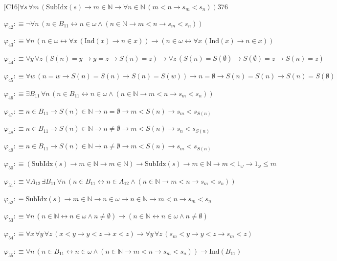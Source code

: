 \begin{fullproof}{[C16]}{$\forall s\,\forall m\,(\mathrm{SubIdx}(s) \to m \in \mathbb{N} \to \forall n \in \mathbb{N}\,(m < n \to s_{m} < s_{n}))$}{376}
\begin{abbrevlist}
\item $\varphi_{42} :\equiv \neg \forall n\,(n \in B_{11} \leftrightarrow n \in \omega \land (n \in \mathbb{N} \to m < n \to s_{m} < s_{n}))$
\item $\varphi_{43} :\equiv \forall n\,(n \in \omega \leftrightarrow \forall x\,(\mathrm{Ind}(x) \to n \in x)) \to (n \in \omega \leftrightarrow \forall x\,(\mathrm{Ind}(x) \to n \in x))$
\item $\varphi_{44} :\equiv \forall y\,\forall z\,(S(n) = y \to y = z \to S(n) = z) \to \forall z\,(S(n) = S(\emptyset) \to S(\emptyset) = z \to S(n) = z)$
\item $\varphi_{45} :\equiv \forall w\,(n = w \to S(n) = S(n) \to S(n) = S(w)) \to n = \emptyset \to S(n) = S(n) \to S(n) = S(\emptyset)$
\item $\varphi_{46} :\equiv \exists B_{11}\,\forall n\,(n \in B_{11} \leftrightarrow n \in \omega \land (n \in \mathbb{N} \to m < n \to s_{m} < s_{n}))$
\item $\varphi_{47} :\equiv n \in B_{11} \to S(n) \in \mathbb{N} \to n = \emptyset \to m < S(n) \to s_{m} < s_{S(n)}$
\item $\varphi_{48} :\equiv n \in B_{11} \to S(n) \in \mathbb{N} \to n \neq \emptyset \to m < S(n) \to s_{n} < s_{S(n)}$
\item $\varphi_{49} :\equiv n \in B_{11} \to S(n) \in \mathbb{N} \to n \neq \emptyset \to m < S(n) \to s_{m} < s_{S(n)}$
\item $\varphi_{50} :\equiv (\mathrm{SubIdx}(s) \to m \in \mathbb{N} \to m \in \mathbb{N}) \to \mathrm{SubIdx}(s) \to m \in \mathbb{N} \to m < 1_{\omega} \to 1_{\omega} \leq m$
\item $\varphi_{51} :\equiv \forall A_{12}\,\exists B_{11}\,\forall n\,(n \in B_{11} \leftrightarrow n \in A_{12} \land (n \in \mathbb{N} \to m < n \to s_{m} < s_{n}))$
\item $\varphi_{52} :\equiv \mathrm{SubIdx}(s) \to m \in \mathbb{N} \to n \in \omega \to n \in \mathbb{N} \to m < n \to s_{m} < s_{n}$
\item $\varphi_{53} :\equiv \forall n\,(n \in \mathbb{N} \leftrightarrow n \in \omega \land n \neq \emptyset) \to (n \in \mathbb{N} \leftrightarrow n \in \omega \land n \neq \emptyset)$
\item $\varphi_{54} :\equiv \forall x\,\forall y\,\forall z\,(x < y \to y < z \to x < z) \to \forall y\,\forall z\,(s_{m} < y \to y < z \to s_{m} < z)$
\item $\varphi_{55} :\equiv \forall n\,(n \in B_{11} \leftrightarrow n \in \omega \land (n \in \mathbb{N} \to m < n \to s_{m} < s_{n})) \to \mathrm{Ind}(B_{11})$

\end{abbrevlist}
\end{fullproof}

